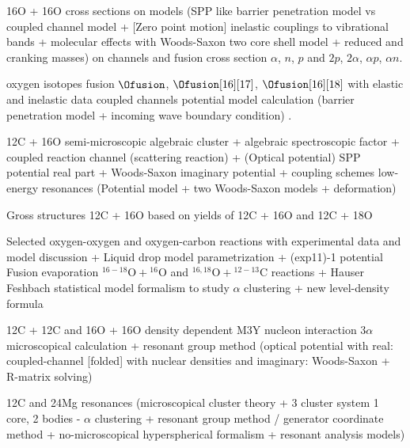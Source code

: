 \documentclass[openany]{book}
\begin{document}
16O + 16O cross sections on models (SPP like barrier penetration model vs coupled channel model + [Zero point motion] inelastic couplings to vibrational bands + molecular effects with Woods-Saxon two core shell model + reduced and cranking masses) \cite{duarte_gasques_oliveira_zagatto_chamon_medina_added_seale_alcantara-nunez_rossi_et_2015} on channels and fusion cross section 
\cite{kuronen_keinonen_tikkanen_1987} $\alpha$, $n$, $p$ and $2p$, $2\alpha$, $\alpha p$, $\alpha n$.

oxygen isotopes fusion $\Ofusion$, $\Ofusion[16][17]$, $\Ofusion[16][18]$ with elastic and inelastic data \cite{thomas_chen_hinds_meredith_olson_1986}
coupled channels potential model calculation (barrier penetration model + incoming wave boundary condition) \cite{guimin_deji_xiaowu_1992}.

12C + 16O semi-microscopic algebraic cluster  + algebraic spectroscopic factor + coupled reaction channel (scattering reaction) + (Optical potential) SPP potential real part + Woods-Saxon imaginary potential + coupling schemes  \cite{ferreira_lubian_linares_ermamatov_yepez-martinez_hess_2019}
low-energy resonances (Potential model + two Woods-Saxon models + deformation) \cite{torilov_maltsev_zherebchevsky_2021}

Gross structures 12C + 16O based on yields of 12C + 16O and 12C + 18O \cite{chan_bohn_vandenbosch_sielemann_cramer_bernhardt_bhang_chiang_1979}

Selected oxygen-oxygen and oxygen-carbon reactions with experimental data and model discussion + Liquid drop model parametrization + (exp11)-1 potential  \cite{kovar_geesaman_braid_eisen_henning_ophel_paul_rehm_sanders_sperr_et_1979}
Fusion evaporation $\mathrm{{}^{16-18}O + {}^{16}O}$ and $\mathrm{{}^{16, 18}O+ {}^{12-13}C}$ reactions + Hauser Feshbach statistical model formalism to study $\alpha$ clustering + new level-density formula \cite{wang_ren_bai_2020}

12C + 12C and 16O + 16O density dependent M3Y nucleon interaction $3\alpha$ microscopical calculation + resonant group method (optical potential with real: coupled-channel [folded] with nuclear densities and imaginary: Woods-Saxon + R-matrix solving)  \cite{assuncao_descouvemont_2015}

12C and 24Mg resonances (microscopical cluster theory + 3 cluster system 1 core, 2 bodies - $\alpha$ clustering + resonant group method / generator coordinate method + no-microscopical hyperspherical formalism + resonant analysis models) \cite{descouvemont_2021}
\end{document}
